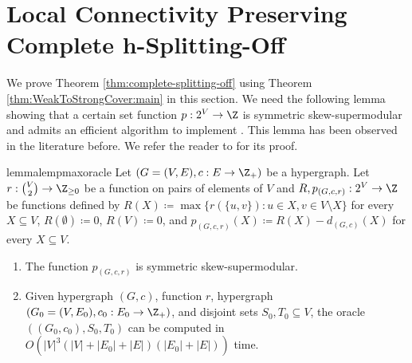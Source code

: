\section{Local Connectivity Preserving Complete h-Splitting-Off}
\label{sec:hypergraph-splitting-off-proof}
We prove Theorem \ref{thm:complete-splitting-off} using Theorem \ref{thm:WeakToStrongCover:main} in this section. 
We need the following lemma showing that a certain set function $p: 2^V\rightarrow \Z$ is symmetric skew-supermodular and admits an efficient algorithm to implement . This lemma has been observed in the literature before. We refer the reader to  for its proof. 

\begin{restatable}{lemma}{lempmaxoracle}\label{lemma:helper-for-p-max-oracle}
    Let $(G=(V, E), c: E\rightarrow \Z_+)$ be a hypergraph. Let $r:\binom{V}{2}\rightarrow \Z_{\ge 0}$ be a function on pairs of elements of $V$ and $R, p_{(G, c, r)}:2^V\rightarrow \Z$ be functions defined by $R(X)\coloneqq \max\{r(\{u, v\}): u\in X, v\in V\setminus X\}$ for every $X\subseteq V$, $R(\emptyset)\coloneqq 0$, $R(V)\coloneqq 0$, and $p_{(G, c, r)}(X)\coloneqq R(X)-d_{(G, c)}(X)$ for every $X\subseteq V$. 
    \begin{enumerate}
        \item The function $p_{(G, c, r)}$ is symmetric skew-supermodular. 
        \item 
        Given hypergraph $(G, c)$, function $r$, hypergraph $(G_0=(V, E_0), c_0: E_0\rightarrow \Z_{+})$, and disjoint sets $S_0, T_0\subseteq V$, the oracle   $((G_0, c_0), S_0, T_0)$ can be computed in $O(|V|^3(|V|+|E_0|+|E|)(|E_0|+|E|))$ time.

    \end{enumerate}
\end{restatable}


